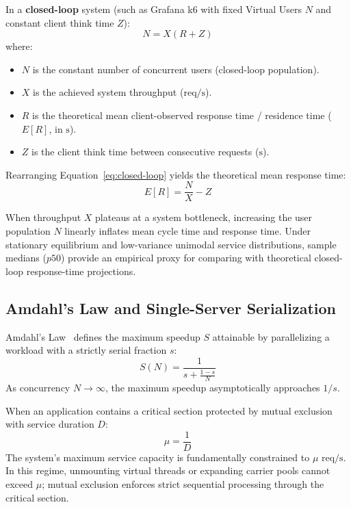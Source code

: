In a \textbf{closed-loop} system (such as Grafana k6 with fixed Virtual Users $N$ and constant client think time $Z$):
\begin{equation}
  \label{eq:closed-loop}
  N = X (R + Z)
\end{equation}
where:
\begin{itemize}
  \item $N$ is the constant number of concurrent users (closed-loop population).
  \item $X$ is the achieved system throughput ($\text{req/s}$).
  \item $R$ is the theoretical mean client-observed response time / residence time ($E[R]$, in $\text{s}$).
  \item $Z$ is the client think time between consecutive requests ($\text{s}$).
\end{itemize}

Rearranging Equation~\ref{eq:closed-loop} yields the theoretical mean response time:
\begin{equation}
  \label{eq:response-time}
  E[R] = \frac{N}{X} - Z
\end{equation}

When throughput $X$ plateaus at a system bottleneck, increasing the user population $N$ linearly inflates mean cycle time and response time. Under stationary equilibrium and low-variance unimodal service distributions, sample medians ($p50$) provide an empirical proxy for comparing with theoretical closed-loop response-time projections.

\subsection{Amdahl's Law and Single-Server Serialization}
Amdahl's Law~\cite{Amdahl1967} defines the maximum speedup $S$ attainable by parallelizing a workload with a strictly serial fraction $s$:
\begin{equation}
  \label{eq:amdahls-law}
  S(N) = \frac{1}{s + \frac{1 - s}{N}}
\end{equation}
As concurrency $N \to \infty$, the maximum speedup asymptotically approaches $1/s$.

When an application contains a critical section protected by mutual exclusion with service duration $D$:
\begin{equation}
  \label{eq:serialization-ceiling}
  \mu = \frac{1}{D}
\end{equation}
The system's maximum service capacity is fundamentally constrained to $\mu\text{ req/s}$. In this regime, unmounting virtual threads or expanding carrier pools cannot exceed $\mu$; mutual exclusion enforces strict sequential processing through the critical section.
